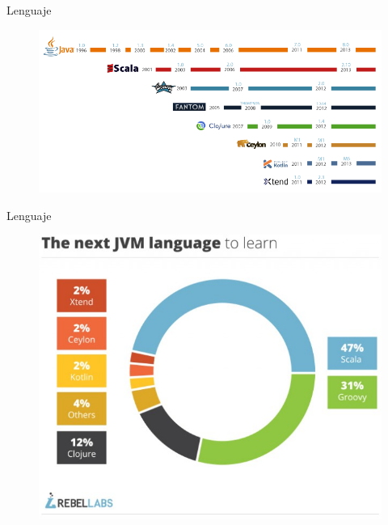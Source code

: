 \documentclass{beamer}
\begin{document}
\begin{frame}{Lenguaje}
	\begin{figure}
		\centering
		\includegraphics[width=\linewidth]{Images/jvm-languages}
	\end{figure}
\end{frame}

\begin{frame}{Lenguaje}
	\begin{figure}
		\centering
		\includegraphics[width=\linewidth]{Images/next-jvm-lang}
	\end{figure}
\end{frame}
\end{document}
